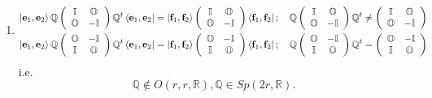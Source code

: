 \documentclass[aps,preprint]{revtex4}
\begin{document}
\begin{enumerate}
\item 
\begin{align}
\left\vert \mathbf{e}_{1},\mathbf{e}_{2}\right\rangle \mathbb{Q}\left( 
\begin{array}{cc}
\mathbb{I} & \mathbb{O} \\ 
\mathbb{O} & -\mathbb{I}%
\end{array}
\right) \mathbb{Q}^{t}\left\langle \mathbf{e}_{1},\mathbf{e}_{2}\right\vert
& =\left\vert \mathbf{f}_{1},\mathbf{f}_{2}\right\rangle \left( 
\begin{array}{cc}
\mathbb{I} & \mathbb{O} \\ 
\mathbb{O} & -\mathbb{I}%
\end{array}
\right) \left\langle \mathbf{f}_{1},\mathbf{f}_{2}\right\vert ;\quad \mathbb{%
Q}\left( 
\begin{array}{cc}
\mathbb{I} & \mathbb{O} \\ 
\mathbb{O} & -\mathbb{I}%
\end{array}
\right) \mathbb{Q}^{t}\neq\left( 
\begin{array}{cc}
\mathbb{I} & \mathbb{O} \\ 
\mathbb{O} & -\mathbb{I}%
\end{array}
\right) \\
\left\vert \mathbf{e}_{1},\mathbf{e}_{2}\right\rangle \mathbb{Q}\left( 
\begin{array}{cc}
\mathbb{O} & -\mathbb{I} \\ 
\mathbb{I} & \mathbb{O}%
\end{array}
\right) \mathbb{Q}^{t}\left\langle \mathbf{e}_{1},\mathbf{e}_{2}\right\vert
& =\left\vert \mathbf{f}_{1},\mathbf{f}_{2}\right\rangle \left( 
\begin{array}{cc}
\mathbb{O} & -\mathbb{I} \\ 
\mathbb{I} & \mathbb{O}%
\end{array}
\right) \left\langle \mathbf{f}_{1},\mathbf{f}_{2}\right\vert ;\quad \mathbb{%
Q}\left( 
\begin{array}{cc}
\mathbb{O} & -\mathbb{I} \\ 
\mathbb{I} & \mathbb{O}%
\end{array}
\right) \mathbb{Q}^{t}=\left( 
\begin{array}{cc}
\mathbb{O} & -\mathbb{I} \\ 
\mathbb{I} & \mathbb{O}%
\end{array}
\right)
\end{align}
i.e. 
\begin{equation}
\mathbb{Q}\notin O\left( r,r,\mathbb{R}\right) ,\mathbb{Q}\in Sp\left( 2r,%
\mathbb{R}\right) .
\end{equation}
\end{enumerate}
\end{document}
